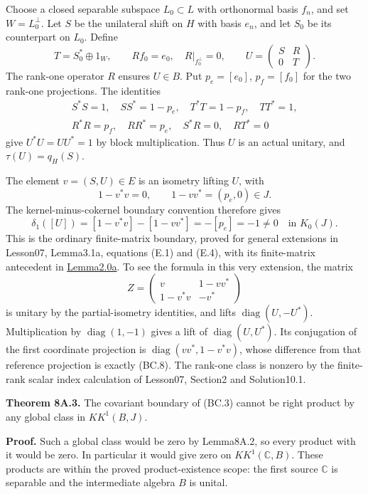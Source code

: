 \documentclass[
  11pt,
]{article}
\begin{document}
Choose a closed separable subspace \(L_0\subset L\) with orthonormal
basis \(f_n\), and set \(W=L_0^\perp\). Let \(S\) be the unilateral
shift on \(H\) with basis \(e_n\), and let \(S_0\) be its counterpart on
\(L_0\). Define \[
 T=S_0^*\oplus1_W,\qquad
 Rf_0=e_0,\quad R|_{f_0^\perp}=0,\qquad
 U=\begin{pmatrix}S&R\\0&T\end{pmatrix}.
 \tag{BC.5}
\] The rank-one operator \(R\) ensures \(U\in B\). Put \(p_e=[e_0]\),
\(p_f=[f_0]\) for the two rank-one projections. The identities \[
 \begin{gathered}
 S^*S=1,\quad SS^*=1-p_e,\quad
 T^*T=1-p_f,\quad TT^*=1,\\
 R^*R=p_f,\quad RR^*=p_e,\quad
 S^*R=0,\quad RT^*=0
 \end{gathered}
 \tag{BC.6}
\] give \(U^*U=UU^*=1\) by block multiplication. Thus \(U\) is an actual
unitary, and \(\tau(U)=q_H(S)\).

The element \(v=(S,U)\in E\) is an isometry lifting \(U\), with \[
 1-v^*v=0,\qquad 1-vv^*=(p_e,0)\in J.
 \tag{BC.7}
\] The kernel-minus-cokernel boundary convention therefore gives \[
 \delta_1([U])=[1-v^*v]-[1-vv^*]
             =-[p_e]=-1\ne0\quad\text{in }K_0(J).
 \tag{BC.8}
\] This is the ordinary finite-matrix boundary, proved for general
extensions in Lesson07, Lemma3.1a, equations (E.1) and (E.4), with its
finite-matrix antecedent in
\href{KT-KK-07.html\#2-the-even-scalar-fredholm-picture}{Lemma2.0a}. To
see the formula in this very extension, the matrix \[
 Z=\begin{pmatrix}v&1-vv^*\\1-v^*v&-v^*\end{pmatrix}
 \tag{BC.9}
\] is unitary by the partial-isometry identities, and lifts
\(\operatorname{diag}(U,-U^*)\). Multiplication by
\(\operatorname{diag}(1,-1)\) gives a lift of
\(\operatorname{diag}(U,U^*)\). Its conjugation of the first coordinate
projection is \(\operatorname{diag}(vv^*,1-v^*v)\), whose difference
from that reference projection is exactly (BC.8). The rank-one class is
nonzero by the finite-rank scalar index calculation of Lesson07,
Section2 and Solution10.1.

\textbf{Theorem 8A.3.} The covariant boundary of (BC.3) cannot be right
product by any global class in \(KK^1(B,J)\).

\textbf{Proof.} Such a global class would be zero by Lemma8A.2, so every
product with it would be zero. In particular it would give zero on
\(KK^1(\mathbb C,B)\). These products are within the proved
product-existence scope: the first source \(\mathbb C\) is separable and
the intermediate algebra \(B\) is unital.
\end{document}
